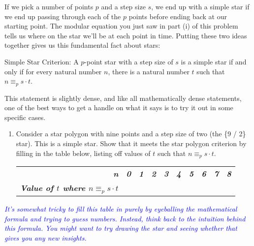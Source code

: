 \documentclass{article}
\renewcommand{\(}{\left(}
\renewcommand{\)}{\right)}
\renewcommand{\emph}[1]{\textit{\textbf{#1}}}
\newcommand{\annotate}[1]{\textit{\textcolor{blue}{#1}}}
\theoremstyle{plain}
\theoremstyle{plain}
\theoremstyle{definition}
\begin{document}
If we pick a number of points $p$ and a step size $s$, we end up with a simple star if we end up passing through each of the $p$ points before ending back at our starting point. The modular equation you just saw in part (i) of this problem tells us where on the star we'll be at each point in time. Putting these two ideas together gives us this fundamental fact about stars:
\begin{center}
    Simple Star Criterion: A $p$-point star with a step size of $s$ is a simple star if and only if for every natural number $n$, there is a natural number $t$ such that $n \equiv_p s \cdot t$.
\end{center}
This statement is slightly dense, and like all mathematically dense statements, one of the best ways to get a handle on what it says is to try it out in some specific cases.

\begin{enumerate}[resume*]
    \item Consider a star polygon with nine points and a step size of two (the \{9 / 2\} star). This is a simple star. Show that it meets the star polygon criterion by filling in the table below, listing off values of $t$ such that $n \equiv_p s \cdot t$.

\begin{shaded}
\begin{table}[H]
\begin{tabular}{rlllllllll}
\emph{n} & \emph{0} & \emph{1} & \emph{2} & \emph{3} & \emph{4} & \emph{5} & \emph{6} & \emph{7} & \emph{8} \\ \cline{2-10} 
\multicolumn{1}{l|}{\emph{Value of $t$ where $n \equiv_p s \cdot t$}} & \multicolumn{1}{l|}{} & \multicolumn{1}{l|}{} & \multicolumn{1}{l|}{} & \multicolumn{1}{l|}{} & \multicolumn{1}{l|}{} & \multicolumn{1}{l|}{} & \multicolumn{1}{l|}{} & \multicolumn{1}{l|}{} & \multicolumn{1}{l|}{} \\ \cline{2-10} 
\end{tabular}
\end{table}
\end{shaded}

\end{enumerate}

\annotate{It's somewhat tricky to fill this table in purely by eyeballing the mathematical formula and trying to guess numbers. Instead, think back to the intuition behind this formula. You might want to try drawing the star and seeing whether that gives you any new insights.} \\
\end{document}
